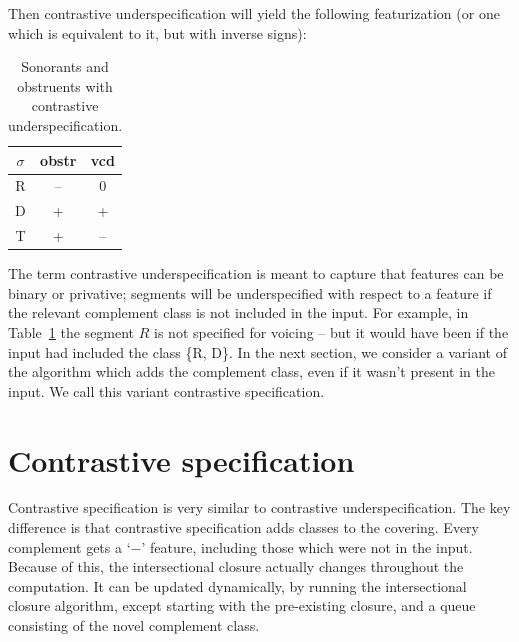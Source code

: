 \documentclass[11pt, oneside]{article}   	%
\begin{document}
\noindent Then contrastive underspecification will yield the following featurization (or one which is equivalent to it, but with inverse signs):

\begin{table}[h]
    \centering
    \begin{tabular} {|c||c|c|}
    \hline
        $\sigma$ & obstr & vcd \\ \hline
        R & -- & 0 \\
        D & + & + \\
        T & + & -- \\
        \hline
    \end{tabular}
    \caption{Sonorants and obstruents with contrastive underspecification.}
    \label{table:underspecification}
\end{table}

The term contrastive underspecification is meant to capture that features can be binary or privative; segments will be underspecified with respect to a feature if the relevant complement class is not included in the input. For example, in Table~\ref{table:underspecification} the segment $R$ is not specified for voicing -- but it would have been if the input had included the class \{R, D\}. In the next section, we consider a variant of the algorithm which adds the complement class, even if it wasn't present in the input. We call this variant contrastive specification.
    
\section{Contrastive specification}

Contrastive specification is very similar to contrastive underspecification. The key difference is that contrastive specification adds classes to the covering. Every complement gets a `$-$' feature, including those which were not in the input. Because of this, the intersectional closure actually changes throughout the computation. It can be updated dynamically, by running the intersectional closure algorithm, except starting with the pre-existing closure, and a queue consisting of the novel complement class.
\end{document}
